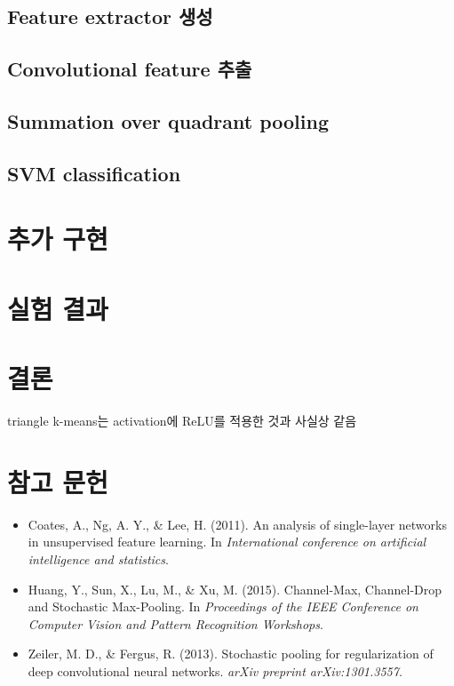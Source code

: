 \documentclass[a4paper,10pt]{article}
\begin{document}
\subsection{Feature extractor 생성}

\subsection{Convolutional feature 추출}

\subsection{Summation over quadrant pooling}

\subsection{SVM classification}


\section{추가 구현}

\section{실험 결과}

\section{결론}

triangle k-means는 activation에 ReLU를 적용한 것과 사실상 같음

\section*{참고 문헌}

\begin{itemize}
\item Coates, A., Ng, A. Y., \& Lee, H. (2011). An analysis of single-layer networks in unsupervised feature learning. In \textit{International conference on artificial intelligence and statistics}.
\item Huang, Y., Sun, X., Lu, M., \& Xu, M. (2015). Channel-Max, Channel-Drop and Stochastic Max-Pooling. In \textit{Proceedings of the IEEE Conference on Computer Vision and Pattern Recognition Workshops}.
\item Zeiler, M. D., \& Fergus, R. (2013). Stochastic pooling for regularization of deep convolutional neural networks. \textit{arXiv preprint arXiv:1301.3557}.
\end{itemize}
\end{document}
